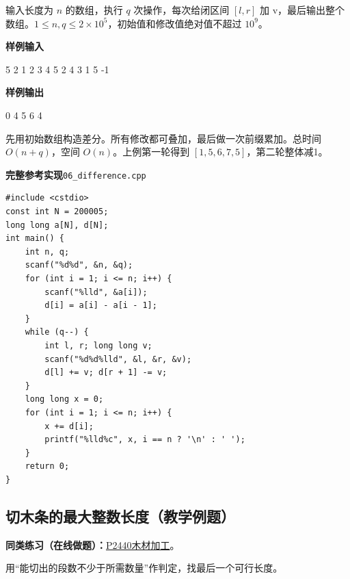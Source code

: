 \documentclass[UTF8,11pt,a4paper,fontset=none]{ctexart}
\newcommand{\practice}[2]{\par\noindent\textbf{同类练习（在线做题）：}\href{https://www.luogu.com.cn/problem/#1}{#1\quad #2}。\par}
\begin{document}
输入长度为 $n$ 的数组，执行 $q$ 次操作，每次给闭区间 $[l,r]$ 加 v，最后输出整个数组。$1\le n,q\le2\times10^5$，初始值和修改值绝对值不超过 $10^9$。
\begin{tcolorbox}[samplebox,title={输入输出样例}]
\textbf{样例输入}
\begin{Sample}
5 2
1 2 3 4 5
2 4 3
1 5 -1
\end{Sample}
\tcblower
\textbf{样例输出}
\begin{Sample}
0 4 5 6 4
\end{Sample}
\end{tcolorbox}
先用初始数组构造差分。所有修改都可叠加，最后做一次前缀累加。总时间 $O(n+q)$，空间 $O(n)$。上例第一轮得到 $[1,5,6,7,5]$，第二轮整体减1。
\par\noindent\begin{minipage}{\linewidth}
\textbf{完整参考实现}\quad\texttt{06\_difference.cpp}
\begin{lstlisting}
#include <cstdio>
const int N = 200005;
long long a[N], d[N];
int main() {
    int n, q;
    scanf("%d%d", &n, &q);
    for (int i = 1; i <= n; i++) {
        scanf("%lld", &a[i]);
        d[i] = a[i] - a[i - 1];
    }
    while (q--) {
        int l, r; long long v;
        scanf("%d%d%lld", &l, &r, &v);
        d[l] += v; d[r + 1] -= v;
    }
    long long x = 0;
    for (int i = 1; i <= n; i++) {
        x += d[i];
        printf("%lld%c", x, i == n ? '\n' : ' ');
    }
    return 0;
}
\end{lstlisting}
\end{minipage}\par

\subsection{切木条的最大整数长度（教学例题）}

\practice{P2440}{木材加工}
用“能切出的段数不少于所需数量”作判定，找最后一个可行长度。
\end{document}
